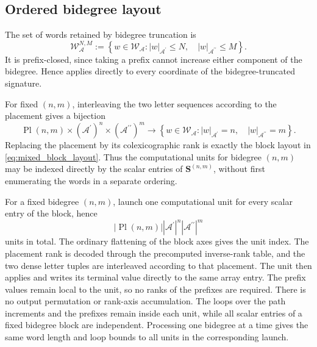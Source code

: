 \documentclass{amsart}
\theoremstyle{definition}
\theoremstyle{remark}
\begin{document}
\subsection{Ordered bidegree layout}

The set of words retained by bidegree truncation is
\[
    \mathcal{W}_{\mathcal{A}}^{N,M}
    :=
    \left\{
        w\in\mathcal{W}_{\mathcal{A}}:
        |w|_{\mathcal{A}^{\prime}}\leq N,
        \quad
        |w|_{\mathcal{A}^{\prime\prime}}\leq M
    \right\}.
\]
It is prefix-closed, since taking a prefix cannot increase either component
of the bidegree. Hence  applies directly
to every coordinate of the bidegree-truncated signature.

For fixed $(n,m)$, interleaving the two letter sequences according to the
placement gives a bijection
\[
    \operatorname{Pl}(n,m)
    \times
    (\mathcal{A}^{\prime})^n
    \times
    (\mathcal{A}^{\prime\prime})^m
    \longrightarrow
    \left\{
        w\in\mathcal{W}_{\mathcal{A}}:
        |w|_{\mathcal{A}^{\prime}}=n,
        \quad
        |w|_{\mathcal{A}^{\prime\prime}}=m
    \right\}.
\]
Replacing the placement by its colexicographic rank is exactly the block
layout in \eqref{eq:mixed_block_layout}. Thus the computational units for
bidegree $(n,m)$ may be indexed directly by the scalar entries of
$\mathbf{S}^{(n,m)}$, without first enumerating the words in a separate
ordering.

\begin{implrmk}
For a fixed bidegree $(n,m)$, launch one computational unit for every scalar
entry of the block, hence
\[
    |\operatorname{Pl}(n,m)|
    |\mathcal{A}^{\prime}|^n
    |\mathcal{A}^{\prime\prime}|^m
\]
units in total. The ordinary flattening of the block axes gives the unit
index. The placement rank is decoded through the precomputed inverse-rank
table, and the two dense letter tuples are interleaved according to that
placement. The unit then applies
 and writes its terminal value directly
to the same array entry. The prefix values remain local to the unit, so no
ranks of the prefixes are required. There is no output permutation or
rank-axis accumulation. The loops over the path increments and the prefixes
remain inside each unit, while all scalar entries of a fixed bidegree block
are independent. Processing one bidegree at a time gives the same word
length and loop bounds to all units in the corresponding launch.
\end{implrmk}
\end{document}
